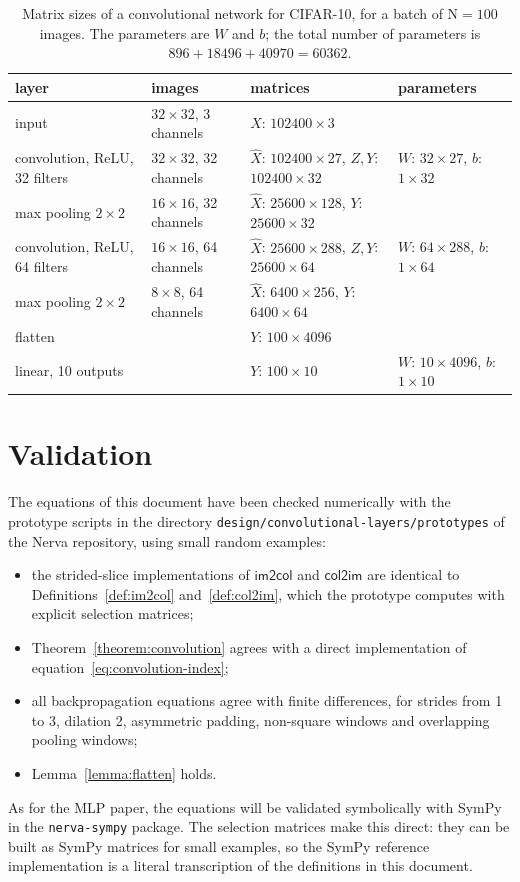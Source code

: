 \documentclass[twoside,11pt]{article}
\newcommand{\const}[1]{\ensuremath{\mathrm{#1}}} %
\newcommand{\func}[1]{\ensuremath{\textsf{#1}}}  %
\newcommand{\im}{\func{im2col}}
\newcommand{\ci}{\func{col2im}}
\begin{document}
\begin{table}[htbp]
\centering
\caption{Matrix sizes of a convolutional network for CIFAR-10, for a batch of $\const{N} = 100$ images. The parameters are $W$ and $b$; the total number of parameters is $896 + 18496 + 40970 = 60362$.}
\label{table:cifar10}
\small
\setlength{\tabcolsep}{4pt}
\begin{tabular}{llll}
\toprule
layer & images & matrices & parameters \\
\midrule
input & $32 \times 32$, 3 channels & $X$: $102400 \times 3$ & \\
convolution, ReLU, 32 filters & $32 \times 32$, 32 channels & $\hat X$: $102400 \times 27$, $Z, Y$: $102400 \times 32$ & $W$: $32 \times 27$, $b$: $1 \times 32$ \\
max pooling $2 \times 2$ & $16 \times 16$, 32 channels & $\hat X$: $25600 \times 128$, $Y$: $25600 \times 32$ & \\
convolution, ReLU, 64 filters & $16 \times 16$, 64 channels & $\hat X$: $25600 \times 288$, $Z, Y$: $25600 \times 64$ & $W$: $64 \times 288$, $b$: $1 \times 64$ \\
max pooling $2 \times 2$ & $8 \times 8$, 64 channels & $\hat X$: $6400 \times 256$, $Y$: $6400 \times 64$ & \\
flatten & & $Y$: $100 \times 4096$ & \\
linear, 10 outputs & & $Y$: $100 \times 10$ & $W$: $10 \times 4096$, $b$: $1 \times 10$ \\
\bottomrule
\end{tabular}
\end{table}

\section{Validation}
The equations of this document have been checked numerically with the prototype scripts in the directory \texttt{design/convolutional-layers/prototypes} of the Nerva repository, using small random examples:
\begin{itemize}
\item the strided-slice implementations of \im{} and \ci{} are identical to Definitions~\ref{def:im2col} and~\ref{def:col2im}, which the prototype computes with explicit selection matrices;
\item Theorem~\ref{theorem:convolution} agrees with a direct implementation of equation~\eqref{eq:convolution-index};
\item all backpropagation equations agree with finite differences, for strides from 1 to 3, dilation 2, asymmetric padding, non-square windows and overlapping pooling windows;
\item Lemma~\ref{lemma:flatten} holds.
\end{itemize}
As for the MLP paper, the equations will be validated symbolically with SymPy in the \texttt{nerva-sympy} package. The selection matrices make this direct: they can be built as SymPy matrices for small examples, so the SymPy reference implementation is a literal transcription of the definitions in this document.
\end{document}
